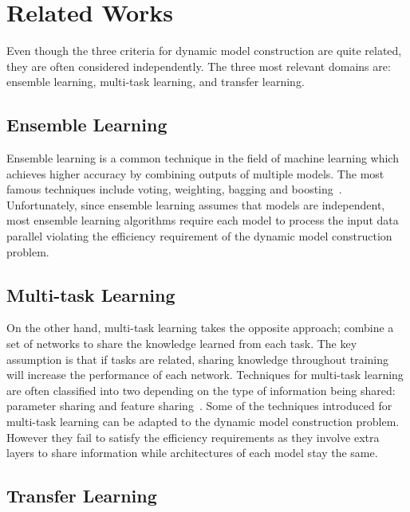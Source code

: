 \documentclass{article}
\begin{document}
\section{Related Works}

Even though the three criteria for dynamic model construction are quite related, they are often considered independently. The three most relevant domains are: ensemble learning, multi-task learning, and transfer learning.

\subsection{Ensemble Learning}
Ensemble learning is a common technique in the field of machine learning which achieves higher accuracy by combining outputs of multiple models. The most famous techniques include voting, weighting, bagging and boosting~\cite{dietterich2000ensemble, breiman1996bagging, freund1996experiments}. Unfortunately, since ensemble learning assumes that models are independent, most ensemble learning algorithms require each model to process the input data parallel violating the efficiency requirement of the dynamic model construction problem.

\subsection{Multi-task Learning}
On the other hand, multi-task learning takes the opposite approach; combine a set of networks to share the knowledge learned from each task. The key assumption is that if tasks are related, sharing knowledge throughout training will increase the performance of each network. Techniques for multi-task learning are often classified into two depending on the type of information being shared: parameter sharing and feature sharing~\cite{ruder2017overview, Caruana1993MultitaskLA, duong2015low, lu2017fully}. Some of the techniques introduced for multi-task learning can be adapted to the dynamic model construction problem. However they fail to satisfy the efficiency requirements as they involve extra layers to share information while architectures of each model stay the same.

\subsection{Transfer Learning}
\end{document}
